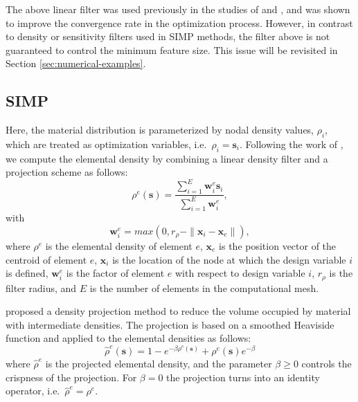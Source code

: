 The above linear filter was used previously in the studies of \citet{KM:12} and \citet{MM:13}, and was shown to improve the convergence rate in the optimization process. However, in contrast to density or sensitivity filters used in SIMP methods, the filter above is not guaranteed to control the minimum feature size. This issue will be revisited in Section \ref{sec:numerical-examples}.


\subsection{SIMP}
\label{sec:optimization-SIMP}

Here, the material distribution is parameterized by nodal density values, $\rho_i$, which are treated as optimization variables, i.e.~$\rho_i=\mathbf{s}_i$. Following the work of \citet{GPB:04}, we compute the elemental density by combining a linear density filter and a projection scheme as follows:
%
\begin{equation}
\label{eq:smoothing-equation-SIMP}
	\rho^{e}(\mathbf{s}) = \frac{ \sum \limits^{E}_{i=1} \mathbf{w}^{e}_{i} \mathbf{s}_i }
					{ \sum \limits^{E}_{i=1} \mathbf{w}^{e}_{i}     },
\end{equation}
%
with
%
\begin{equation}
\label{eq:smoothing-radius-SIMP}
	\mathbf{w}^{e}_{i} = max \left( { 0, r_{\rho} - \parallel \mathbf{x}_i - \mathbf{x}_e \parallel }\right),
\end{equation}
%
where $\rho^{e}$ is the elemental density of element $e$, $\mathbf{x}_e$ is the position vector of the centroid of element $e$, $\mathbf{x}_{i}$ is the location of the node at which the design variable $i$ is defined, $\mathbf{w}^{e}_{i}$ is the factor of element $e$ with respect to design variable $i$, $r_{\rho}$ is the filter radius,  and $E$ is the number of elements in the computational mesh.

\citet{GPB:04} proposed a density projection method to reduce the volume occupied by material with intermediate densities. The projection is based on a smoothed Heaviside function and applied to the elemental densities as follows:
%
\begin{equation}
\label{eq:heaviside-SIMP}
	\hat{\rho}^{e}(\mathbf{s}) = 1 - e^{-\beta \rho^{e}(\mathbf{s})} + \rho^{e}(\mathbf{s}) e^{-\beta}
\end{equation}
%
where $\hat{\rho}^{e}$ is the projected elemental density, and the parameter $\beta \ge 0$ controls the crispness of the projection. For $\beta = 0$ the projection turns into an identity operator, i.e.~$\hat{\rho}^{e}= \rho^{e}$.

